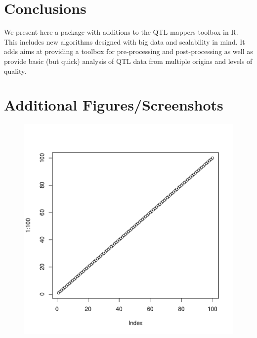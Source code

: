 \documentclass{bioinfo}
\begin{document}
\section*{Conclusions}
  We present here a package with additions to the QTL mappers 
  toolbox in R. This includes new algorithms designed with big
  data and scalability in mind. It adds aims at providing a 
  toolbox for pre-processing and post-processing as well as 
  provide basic (but quick) analysis of QTL data from multiple 
  origins and levels of quality.
\section*{Additional Figures/Screenshots}
\begin{figure}
\includegraphics{Article-003}
\end{figure}


\end{document}
